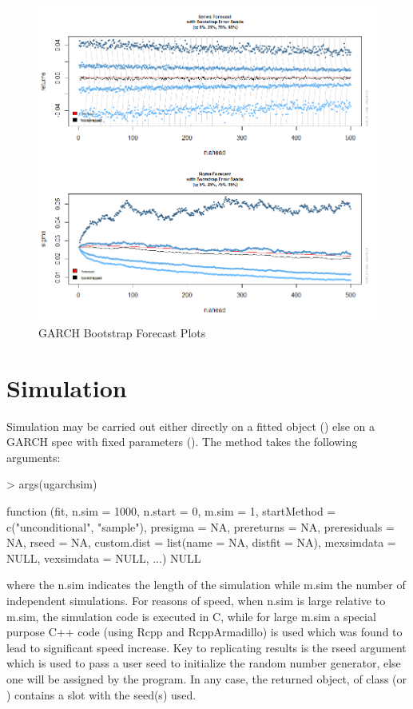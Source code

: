 \begin{figure}
\centering
\includegraphics{boot_partial.png}
\caption[GARCH Bootstrap Forecast Plots]{GARCH Bootstrap Forecast Plots}\label{fig:bootplot}
\end{figure}
\section{Simulation}\label{section:simulation}
Simulation may be carried out either directly on a fitted object (\verb@ugarchsim@)
else on a GARCH spec with fixed parameters (\verb@ugarchpath@). The \verb@ugarchsim@
method takes the following arguments:
\begin{Schunk}
\begin{Sinput}
> args(ugarchsim)
\end{Sinput}
\begin{Soutput}
function (fit, n.sim = 1000, n.start = 0, m.sim = 1, startMethod = c("unconditional",
    "sample"), presigma = NA, prereturns = NA, preresiduals = NA,
    rseed = NA, custom.dist = list(name = NA, distfit = NA),
    mexsimdata = NULL, vexsimdata = NULL, ...)
NULL
\end{Soutput}
\end{Schunk}
where the n.sim indicates the length of the simulation while m.sim the number of
independent simulations. For reasons of speed, when n.sim is large relative to
m.sim, the simulation code is executed in C, while for large m.sim a special
purpose C++ code (using Rcpp and RcppArmadillo) is used which was found to lead
to significant speed increase. Key to replicating results is the rseed argument
which is used to pass a user seed to initialize the random number generator, else
one will be assigned by the program. In any case, the returned object, of class
\verb@uGARCHsim@ (or \verb@uGARCHpath@) contains a slot with the seed(s) used.
